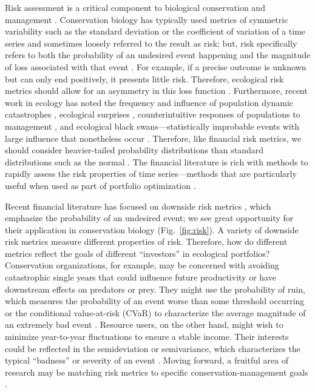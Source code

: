 Risk assessment is a critical component to biological conservation and management \citep{burgman2005}. Conservation biology has typically used metrics of symmetric variability such as the standard deviation or the coefficient of variation of a time series \citep[e.g.][]{greene2010} and sometimes loosely referred to the result as risk; but, risk specifically refers to both the probability of an undesired event happening and the magnitude of loss associated with that event \citep[Fig.~\ref{fig:risk}]{morgan1990}. For example, if a precise outcome is unknown but can only end positively, it presents little risk. Therefore, ecological risk metrics should allow for an asymmetry in this loss function \citep{reckhow1994}. Furthermore, recent work in ecology has noted the frequency and influence of population dynamic catastrophes \citep{gerber2001, ward2007}, ecological surprises \citep{lindenmayer2010, doak2008}, counterintuitive responses of populations to management \citep{pine-iii2009}, and ecological black swans---statistically improbable events with large influence that nonetheless occur \citep{nunez2012}. Therefore, like financial risk metrics, we should consider heavier-tailed probability distributions than standard distributions such as the normal \citep{hummel2009}. The financial literature is rich with methods to rapidly assess the risk properties of time series---methods that are particularly useful when used as part of portfolio optimization \citep{rachev2008}.

Recent financial literature has focused on downside risk metrics \citep{ang2006}, which emphasize the probability of an undesired event; we see great opportunity for their application in conservation biology (Fig.~\ref{fig:risk}). A variety of downside risk metrics measure different properties of risk. Therefore, how do different metrics reflect the goals of different ``investors'' in ecological portfolios? Conservation organizations, for example, may be concerned with avoiding catastrophic single years that could influence future productivity or have downstream effects on predators or prey. They might use the probability of ruin, which measures the probability of an event worse than some threshold occurring \citep{vasicek1987} or the conditional value-at-risk (CVaR) to characterize the average magnitude of an extremely bad event \citep{rockafellar2002, sethi2012a, sethi2012b}. Resource users, on the other hand, might wish to minimize year-to-year fluctuations to ensure a stable income. Their interests could be reflected in the semideviation or semivariance, which characterizes the typical ``badness'' or severity of an event \citep{markowitz1959, sethi2012a, sethi2012b}. Moving forward, a fruitful area of research may be matching risk metrics to specific conservation-management goals \citep{sethi2012a}.

